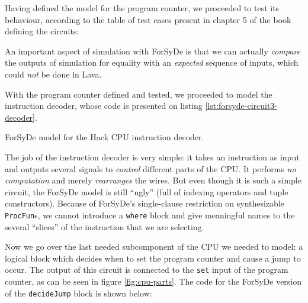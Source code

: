             Having defined the model for the program counter, we proceeded to test its behaviour,
            according to the table of test cases present in chapter 5\cite{nand2tetris-chapter-cpu}
            of the book defining the circuits:


            An important aspect of simulation with ForSyDe is that we can actually \emph{compare}
            the outputs of simulation for equality with an \emph{expected} sequence of inputs, which
            could \emph{not} be done in Lava.

            With the program counter defined and tested, we proceeded to model the instruction
            decoder, whose code is presented on listing \ref{lst:forsyde-circuit3-decoder}.

            \begin{listing}[h!]
                \caption{ForSyDe model for the Hack CPU instruction decoder.
                    \label{lst:forsyde-circuit3-decoder}}
            \end{listing}

            The job of the instruction decoder is very simple: it takes an instruction as input and
            outputs several signals to \emph{control} different parts of the CPU. It performs
            \emph{no computation} and merely \emph{rearranges} the wires. But even though it is such
            a simple circuit, the ForSyDe model is still ``ugly'' (full of indexing operators and
            tuple constructors). Because of ForSyDe's single-clause restriction on synthesizable
            \texttt{ProcFun}s, we cannot introduce a \texttt{where} block and give meaningful names
            to the several ``slices'' of the instruction that we are selecting.

            Now we go over the last needed subcomponent of the CPU we needed to model: a logical
            block which decides when to set the program counter and cause a jump to occur. The
            output of this circuit is connected to the \texttt{set} input of the program counter, as
            can be seen in figure \ref{fig:cpu-parts}. The code for the ForSyDe version of the
            \texttt{decideJump} block is shown below:


